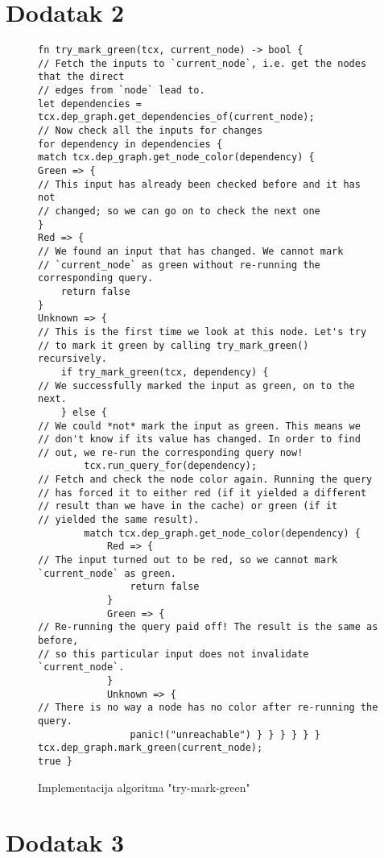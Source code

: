\section{Dodatak 2}
\begin{figure}[H]
\begin{listing}[H]
\begin{verbatim}
fn try_mark_green(tcx, current_node) -> bool {
// Fetch the inputs to `current_node`, i.e. get the nodes that the direct
// edges from `node` lead to.
let dependencies = tcx.dep_graph.get_dependencies_of(current_node);
// Now check all the inputs for changes
for dependency in dependencies {
match tcx.dep_graph.get_node_color(dependency) {
Green => {
// This input has already been checked before and it has not
// changed; so we can go on to check the next one
}
Red => {
// We found an input that has changed. We cannot mark
// `current_node` as green without re-running the corresponding query.
    return false
}
Unknown => {
// This is the first time we look at this node. Let's try
// to mark it green by calling try_mark_green() recursively.
    if try_mark_green(tcx, dependency) {
// We successfully marked the input as green, on to the next.
    } else {
// We could *not* mark the input as green. This means we
// don't know if its value has changed. In order to find
// out, we re-run the corresponding query now!
        tcx.run_query_for(dependency);
// Fetch and check the node color again. Running the query
// has forced it to either red (if it yielded a different
// result than we have in the cache) or green (if it
// yielded the same result).
        match tcx.dep_graph.get_node_color(dependency) {
            Red => {
// The input turned out to be red, so we cannot mark `current_node` as green.
                return false
            }
            Green => {
// Re-running the query paid off! The result is the same as before, 
// so this particular input does not invalidate `current_node`.
            }
            Unknown => {
// There is no way a node has no color after re-running the query.
                panic!("unreachable") } } } } } }
tcx.dep_graph.mark_green(current_node);
true }
\end{verbatim}
\caption{Implementacija algoritma "try-mark-green"}
\label{lst:bonus_try_mark_green}
\end{listing}
\end{figure}

\section{Dodatak 3}

